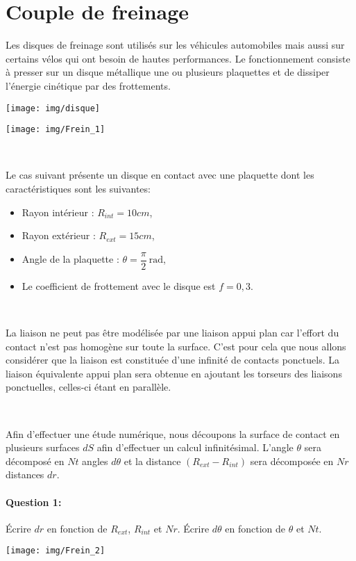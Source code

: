 

\section{Couple de freinage}

Les disques de freinage sont utilisés sur les véhicules automobiles mais aussi sur certains vélos qui ont besoin de hautes performances. Le fonctionnement consiste à presser sur un disque métallique une ou plusieurs plaquettes et de dissiper l'énergie cinétique par des frottements.

\begin{minipage}{0.47\linewidth}
 \centering\texttt{[image: img/disque]}
\end{minipage}\hfill
\begin{minipage}{0.47\linewidth}
 \centering\texttt{[image: img/Frein\_1]}
\end{minipage}

~\

Le cas suivant présente un disque en contact avec une plaquette dont les caractéristiques sont les suivantes:
\begin{itemize}
 \item Rayon intérieur : $R_{int}=10cm$,
 \item Rayon extérieur : $R_{ext}=15cm$,
 \item Angle de la plaquette : $\theta=\dfrac{\pi}{2}\ \mathrm{rad}$,
 \item Le coefficient de frottement avec le disque est $f=0,3$.
\end{itemize}

~\

La liaison ne peut pas être modélisée par une liaison appui plan car l'effort du contact n'est pas homogène sur toute la surface. C'est pour cela que nous allons considérer que la liaison est constituée d'une infinité de contacts ponctuels. La liaison équivalente appui plan sera obtenue en ajoutant les torseurs des liaisons ponctuelles, celles-ci étant en parallèle.

~\

\begin{minipage}{0.47\linewidth}
Afin d'effectuer une étude numérique, nous découpons la surface de contact en plusieurs surfaces $dS$ afin d'effectuer un calcul infinitésimal. L'angle $\theta$ sera décomposé en $Nt$ angles $d\theta$ et la distance $(R_{ext}-R_{int})$ sera décomposée en $Nr$ distances $dr$.

\paragraph{Question 1:} Écrire $dr$ en fonction de $R_{ext}$, $R_{int}$ et $Nr$. Écrire $d\theta$ en fonction de $\theta$ et $Nt$.
\end{minipage}\hfill
\begin{minipage}{0.47\linewidth}
 \centering\texttt{[image: img/Frein\_2]}
\end{minipage}

